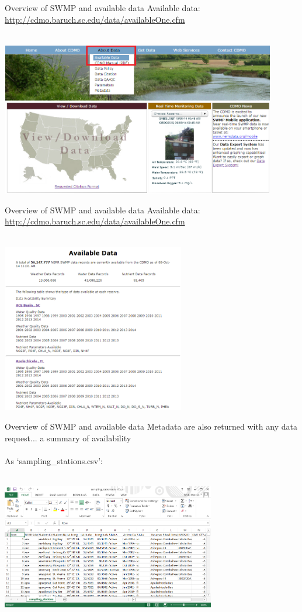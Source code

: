 \documentclass[xcolor=svgnames]{beamer}\usepackage[]{graphicx}\usepackage[]{color}
\begin{document}
\begin{frame}[t]{Overview of SWMP and available data}
Available data: \href{http://cdmo.baruch.sc.edu/data/availableOne.cfm}{http://cdmo.baruch.sc.edu/data/availableOne.cfm}\\~\\
\centerline{\includegraphics[width = 0.9\textwidth]{avail_dat2.png}}
\end{frame}

\begin{frame}[t]{Overview of SWMP and available data}
Available data: \href{http://cdmo.baruch.sc.edu/data/availableOne.cfm}{http://cdmo.baruch.sc.edu/data/availableOne.cfm}\\~\\
\centerline{\includegraphics[width = 0.6\textwidth]{avail_dat.png}}
\end{frame}

\begin{frame}[t]{Overview of SWMP and available data}
Metadata are also returned with any data request...  a summary of availability\\~\\
As `sampling\_stations.csv':\\~\\
\centerline{\includegraphics[width = 0.7\textwidth]{samp_stat.png}}
\end{frame}
\end{document}
